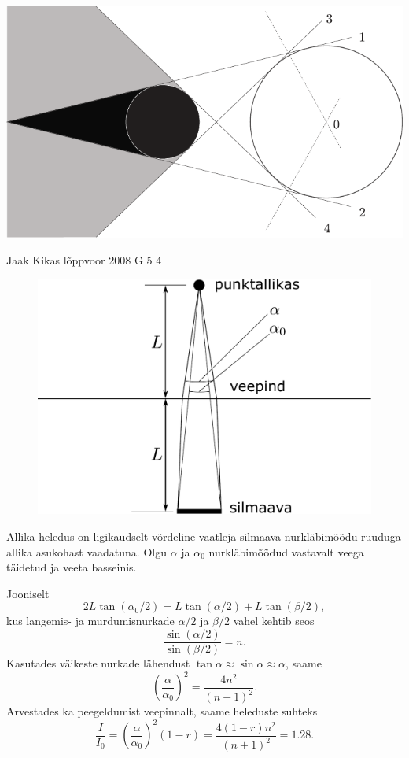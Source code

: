 \documentclass[11pt, twoside]{article}
\begin{document}
{{\begin{center}
	\includegraphics[width=\textwidth]{2007-v2g-06-lah}
\end{center}
\fi
}

{Jaak Kikas} %
{lõppvoor} %
{2008} %
{G 5} %
{4} %
{

\ifSolution
\begin{figure}
	\begin{center}
		\includegraphics[width=0.95\linewidth]{2008-v3g-05-lah}
	\end{center}
\end{figure}
Allika heledus on ligikaudselt võrdeline vaatleja silmaava nurkläbimõõdu ruuduga allika asukohast vaadatuna. Olgu $\alpha$ ja $\alpha_0$ nurkläbimõõdud vastavalt veega täidetud ja veeta basseinis.

Jooniselt
\[
2L\tan (\alpha_0 /2) = L\tan (\alpha /2) + L\tan (\beta /2),
\]
kus langemis- ja murdumisnurkade $\alpha /2$ ja $\beta /2$ vahel kehtib seos
\[
\frac{\sin(\alpha/2)}{\sin(\beta/2)} = n.
\]
Kasutades väikeste nurkade lähendust $\tan\alpha\approx\sin\alpha\approx\alpha$, saame 
\[
\left(\frac{\alpha}{\alpha_0}\right)^2 = \frac{4n^2}{(n+1)^2}.
\]
Arvestades ka peegeldumist veepinnalt, saame heleduste suhteks
\[
\frac{I}{I_{0}}=\left(\frac{\alpha}{\alpha_0}\right)^2(1-r) = \frac{4(1-r) n^{2}}{(n+1)^{2}}=\num{1,28}.
\]
\fi
}

}
\end{document}
